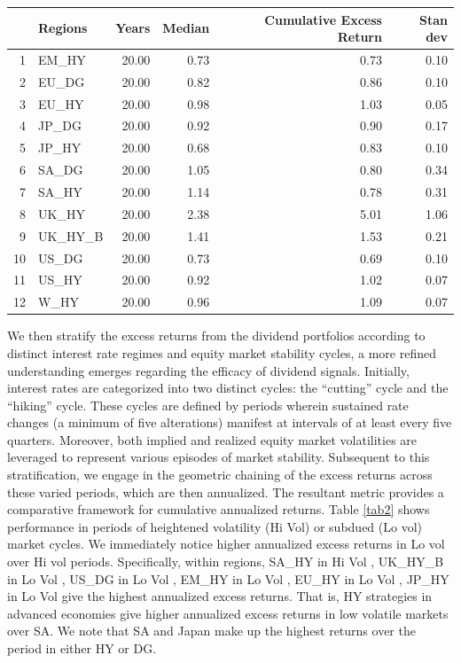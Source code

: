 \documentclass[12pt,preprint, authoryear]{elsarticle}
\let\origtable\table
\let\endorigtable\endtable
\renewenvironment{table}[1][2] {
    \expandafter\origtable\expandafter[H]
} {
    \endorigtable
}
\numberwithin{equation}{section}
\numberwithin{figure}{section}
\numberwithin{table}{section}
\begin{document}
\begin{table}[H]
\centering
\begin{tabular}{rlrrrr}
  \hline
 & Regions & Years & Median & Cumulative Excess Return & Stan dev \\ 
  \hline
1 & EM\_HY & 20.00 & 0.73 & 0.73 & 0.10 \\ 
  2 & EU\_DG & 20.00 & 0.82 & 0.86 & 0.10 \\ 
  3 & EU\_HY & 20.00 & 0.98 & 1.03 & 0.05 \\ 
  4 & JP\_DG & 20.00 & 0.92 & 0.90 & 0.17 \\ 
  5 & JP\_HY & 20.00 & 0.68 & 0.83 & 0.10 \\ 
  6 & SA\_DG & 20.00 & 1.05 & 0.80 & 0.34 \\ 
  7 & SA\_HY & 20.00 & 1.14 & 0.78 & 0.31 \\ 
  8 & UK\_HY & 20.00 & 2.38 & 5.01 & 1.06 \\ 
  9 & UK\_HY\_B & 20.00 & 1.41 & 1.53 & 0.21 \\ 
  10 & US\_DG & 20.00 & 0.73 & 0.69 & 0.10 \\ 
  11 & US\_HY & 20.00 & 0.92 & 1.02 & 0.07 \\ 
  12 & W\_HY & 20.00 & 0.96 & 1.09 & 0.07 \\ 
   \hline
\end{tabular}
\caption{Cumulative Excess Return \label{tab1}} 
\end{table}

We then stratify the excess returns from the dividend portfolios
according to distinct interest rate regimes and equity market stability
cycles, a more refined understanding emerges regarding the efficacy of
dividend signals. Initially, interest rates are categorized into two
distinct cycles: the ``cutting'' cycle and the ``hiking'' cycle. These
cycles are defined by periods wherein sustained rate changes (a minimum
of five alterations) manifest at intervals of at least every five
quarters. Moreover, both implied and realized equity market volatilities
are leveraged to represent various episodes of market stability.
Subsequent to this stratification, we engage in the geometric chaining
of the excess returns across these varied periods, which are then
annualized. The resultant metric provides a comparative framework for
cumulative annualized returns. Table \ref{tab2} shows performance in
periods of heightened volatility (Hi Vol) or subdued (Lo vol) market
cycles. We immediately notice higher annualized excess returns in Lo vol
over Hi vol periods. Specifically, within regions, SA\_HY in Hi Vol ,
UK\_HY\_B in Lo Vol , US\_DG in Lo Vol , EM\_HY in Lo Vol , EU\_HY in Lo
Vol , JP\_HY in Lo Vol give the highest annualized excess returns. That
is, HY strategies in advanced economies give higher annualized excess
returns in low volatile markets over SA. We note that SA and Japan make
up the highest returns over the period in either HY or DG.
\end{document}
